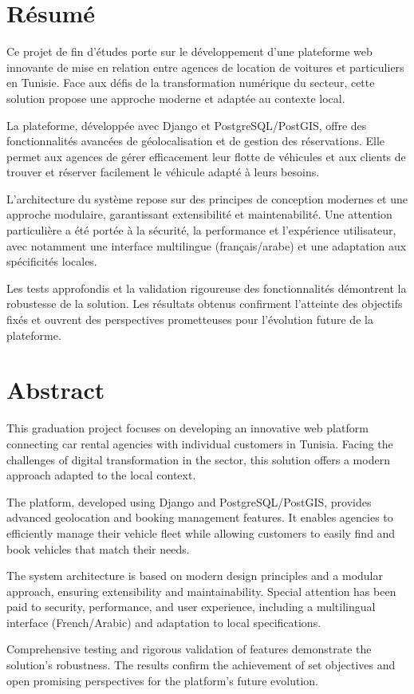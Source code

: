 \chapter*{Résumé}

Ce projet de fin d'études porte sur le développement d'une plateforme web innovante de mise en relation entre agences de location de voitures et particuliers en Tunisie. Face aux défis de la transformation numérique du secteur, cette solution propose une approche moderne et adaptée au contexte local.

La plateforme, développée avec Django et PostgreSQL/PostGIS, offre des fonctionnalités avancées de géolocalisation et de gestion des réservations. Elle permet aux agences de gérer efficacement leur flotte de véhicules et aux clients de trouver et réserver facilement le véhicule adapté à leurs besoins.

L'architecture du système repose sur des principes de conception modernes et une approche modulaire, garantissant extensibilité et maintenabilité. Une attention particulière a été portée à la sécurité, la performance et l'expérience utilisateur, avec notamment une interface multilingue (français/arabe) et une adaptation aux spécificités locales.

Les tests approfondis et la validation rigoureuse des fonctionnalités démontrent la robustesse de la solution. Les résultats obtenus confirment l'atteinte des objectifs fixés et ouvrent des perspectives prometteuses pour l'évolution future de la plateforme.

\vspace{1cm}

\chapter*{Abstract}

This graduation project focuses on developing an innovative web platform connecting car rental agencies with individual customers in Tunisia. Facing the challenges of digital transformation in the sector, this solution offers a modern approach adapted to the local context.

The platform, developed using Django and PostgreSQL/PostGIS, provides advanced geolocation and booking management features. It enables agencies to efficiently manage their vehicle fleet while allowing customers to easily find and book vehicles that match their needs.

The system architecture is based on modern design principles and a modular approach, ensuring extensibility and maintainability. Special attention has been paid to security, performance, and user experience, including a multilingual interface (French/Arabic) and adaptation to local specifications.

Comprehensive testing and rigorous validation of features demonstrate the solution's robustness. The results confirm the achievement of set objectives and open promising perspectives for the platform's future evolution.
